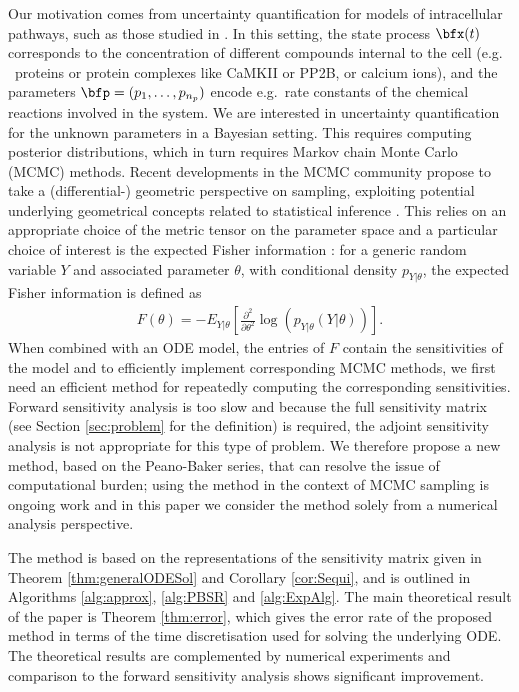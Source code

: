 \documentclass[DIV=12]{scrartcl} %
\theoremstyle{definition}
\begin{document}
Our motivation comes from uncertainty quantification for models of intracellular pathways, such as those studied in \cite{Eriksson19}. In this setting, the state process $\bfx(t)$ corresponds to the concentration of different compounds internal to the cell (e.g. \ proteins or protein complexes like CaMKII or PP2B, or calcium ions), 
and the parameters $\bfp = (p_1, \dots , p_{n_p})$ encode e.g.\ rate constants of the chemical reactions involved in the system.  We are interested in uncertainty quantification for the unknown parameters in a Bayesian setting. This requires computing posterior distributions, which in turn requires Markov chain Monte Carlo (MCMC) methods. Recent developments in the MCMC community propose to take a (differential-) geometric perspective on sampling, exploiting potential underlying geometrical concepts related to statistical inference \cite{GiroCal, TSA20, BFXKG18}. This relies on an appropriate choice of the metric tensor on the parameter space and a particular choice of interest is the expected Fisher information \cite{GiroCal}: for a generic random variable $Y$ and associated parameter $\theta$, with conditional density $p_{Y | \theta}$, the expected Fisher information is defined as
\begin{align*}
    F (\theta) = - E_{Y | \theta} \left[ \frac{\partial ^2}{ \partial \theta ^2} \log \left( p_{Y |\theta} (Y | \theta) \right)  \right].
\end{align*}
When combined with an ODE model, the entries of $F$ contain the sensitivities of the model and to efficiently implement corresponding MCMC methods, we first need an efficient method for repeatedly computing the corresponding sensitivities. Forward sensitivity analysis is too slow and because the full sensitivity matrix (see Section \ref{sec:problem} for the definition) is required, the adjoint sensitivity analysis is not appropriate for this type of problem. We therefore propose a new method, based on the Peano-Baker series, that can resolve the issue of computational burden; using the method in the context of MCMC sampling is ongoing work and in this paper we consider the method solely from a numerical analysis perspective.

The method is based on the representations of the sensitivity matrix given in Theorem \ref{thm:generalODESol} and Corollary \ref{cor:Sequi}, and is outlined in Algorithms \ref{alg:approx}, \ref{alg:PBSR} and \ref{alg:ExpAlg}. The main theoretical result of the paper is Theorem \ref{thm:error}, which gives the error rate of the proposed method in terms of the time discretisation used for solving the underlying ODE. The theoretical results are complemented by numerical experiments and comparison to the forward sensitivity analysis shows significant improvement. 
\end{document}
